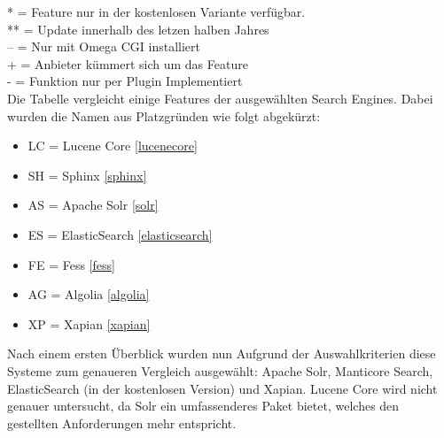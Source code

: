 \begin{table}
    *  = Feature nur in der kostenlosen Variante verfügbar. \\
    ** = Update innerhalb des letzen halben Jahres \\
    -- = Nur mit Omega CGI installiert \\
    +  = Anbieter kümmert sich um das Feature \\
    -  = Funktion nur per Plugin Implementiert \\

    Die Tabelle vergleicht einige Features der ausgewählten Search Engines. Dabei wurden die Namen aus Platzgründen wie folgt abgekürzt:

    \begin{itemize}
        \item LC = Lucene Core \ref{lucenecore}
        \item SH = Sphinx \ref{sphinx}
        \item AS = Apache Solr \ref{solr}
        \item ES = ElasticSearch \ref{elasticsearch}
        \item FE = Fess \ref{fess}
        \item AG = Algolia \ref{algolia}
        \item XP = Xapian \ref{xapian}
    \end{itemize} 


\end{table}


Nach einem ersten Überblick wurden nun Aufgrund der Auswahlkriterien diese Systeme zum genaueren Vergleich ausgewählt: Apache Solr, Manticore Search, ElasticSearch (in der kostenlosen Version) und Xapian. Lucene Core wird nicht genauer untersucht, da Solr ein umfassenderes Paket bietet, welches den gestellten Anforderungen mehr entspricht.